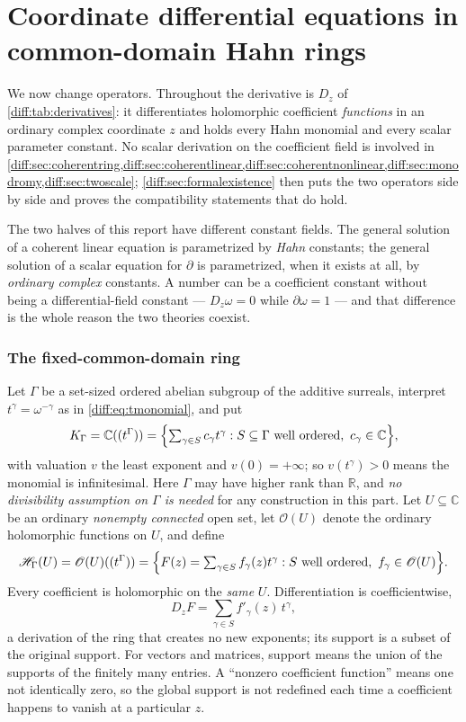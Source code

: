 \documentclass[11pt,letterpaper]{article}
\numberwithin{equation}{section}
\theoremstyle{definition}
\theoremstyle{remark}
\newcommand{\R}{\mathbb R}
\newcommand{\C}{\mathbb C}
\newcommand{\der}{\partial}
\newcommand{\Hring}{\mathscr H}
\newcommand{\Hol}{\mathscr O}
\newcommand{\Dz}{D_{z}}
\begin{document}
\part{Coordinate differential equations in common-domain Hahn rings}
\label{diff:part:coordinate}

We now change operators. Throughout \cref{diff:part:coordinate} the
derivative is $\Dz$ of \cref{diff:tab:derivatives}: it differentiates
holomorphic coefficient \emph{functions} in an ordinary complex coordinate
$z$ and holds every Hahn monomial and every scalar parameter constant. No
scalar derivation on the coefficient field is involved in
\cref{diff:sec:coherentring,diff:sec:coherentlinear,diff:sec:coherentnonlinear,diff:sec:monodromy,diff:sec:twoscale};
\cref{diff:sec:formalexistence} then puts the two operators side by side and
proves the compatibility statements that do hold.

The two halves of this report have different constant fields. The general
solution of a coherent linear equation is parametrized by \emph{Hahn}
constants; the general solution of a scalar equation for $\der$ is
parametrized, when it exists at all, by \emph{ordinary complex} constants. A
number can be a coefficient constant without being a differential-field
constant --- $\Dz\omega=0$ while $\der\omega=1$ --- and that difference is the
whole reason the two theories coexist.

\section{The fixed-common-domain ring}
\label{diff:sec:coherentring}

Let $\Gamma$ be a set-sized ordered abelian subgroup of the additive surreals,
interpret $t^{\gamma}=\omega^{-\gamma}$ as in \cref{diff:eq:tmonomial}, and put
\[
 K_{\Gamma}=\C((t^{\Gamma}))
 =\Bigl\{\textstyle\sum_{\gamma\in S}c_{\gamma}t^{\gamma}:
 S\subseteq\Gamma\text{ well ordered},\ c_{\gamma}\in\C\Bigr\},
\]
with valuation $v$ the least exponent and $v(0)=+\infty$; so $v(t^{\gamma})>0$
means the monomial is infinitesimal. Here $\Gamma$ may have higher rank than
$\R$, and \emph{no divisibility assumption on $\Gamma$ is needed} for any
construction in this part. Let $U\subseteq\C$ be an ordinary \emph{nonempty connected}
open set, let $\Hol(U)$ denote the ordinary holomorphic functions on $U$, and
define
\begin{equation}\label{diff:eq:coherentring}
 \Hring_{\Gamma}(U)=\Hol(U)((t^{\Gamma}))
 =\Bigl\{F(z)=\textstyle\sum_{\gamma\in S}f_{\gamma}(z)t^{\gamma}:
 S\text{ well ordered},\ f_{\gamma}\in\Hol(U)\Bigr\}.
\end{equation}
Every coefficient is holomorphic on the \emph{same} $U$. Differentiation is
coefficientwise,
\[
 \Dz F=\sum_{\gamma\in S}f'_{\gamma}(z)\,t^{\gamma},
\]
a derivation of the ring that creates no new exponents; its support is a
subset of the original support. For vectors and matrices, support means the
union of the supports of the finitely many entries. A ``nonzero coefficient
function'' means one not identically zero, so the global support is not
redefined each time a coefficient happens to vanish at a particular $z$.
\end{document}
